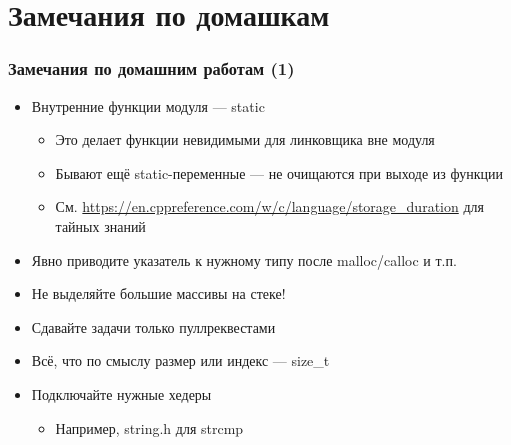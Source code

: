 \documentclass{../../slides-style}
\begin{document}
    \begin{frame}[plain]
        \titlepage
    \end{frame}

    \section{Замечания по домашкам}

    \begin{frame}
        \frametitle{Замечания по домашним работам (1)}
        \begin{itemize}
            \item Внутренние функции модуля --- static
            \begin{itemize}
                \item Это делает функции невидимыми для линковщика вне модуля
                \item Бывают ещё static-переменные --- не очищаются при выходе из функции
                \item См. \url{https://en.cppreference.com/w/c/language/storage_duration} для тайных знаний
            \end{itemize}
            \item Явно приводите указатель к нужному типу после malloc/calloc и т.п.
            \item Не выделяйте большие массивы на стеке!
            \item Сдавайте задачи только пуллреквестами
            \item Всё, что по смыслу размер или индекс --- size\_t
            \item Подключайте нужные хедеры
            \begin{itemize}
                \item Например, string.h для strcmp
            \end{itemize}
        \end{itemize}
    \end{frame}
\end{document}
